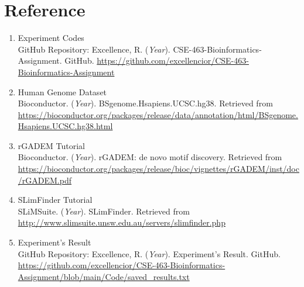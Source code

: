 \section{Reference}
\begin{enumerate}
    \item Experiment Codes \\
    GitHub Repository: Excellence, R. (\textit{Year}). CSE-463-Bioinformatics-Assignment. GitHub. \url{https://github.com/excellencior/CSE-463-Bioinformatics-Assignment}
    
    \item Human Genome Dataset \\
    Bioconductor. (\textit{Year}). BSgenome.Hsapiens.UCSC.hg38. Retrieved from \url{https://bioconductor.org/packages/release/data/annotation/html/BSgenome.Hsapiens.UCSC.hg38.html}
    
    \item rGADEM Tutorial \\
    Bioconductor. (\textit{Year}). rGADEM: de novo motif discovery. Retrieved from \url{https://bioconductor.org/packages/release/bioc/vignettes/rGADEM/inst/doc/rGADEM.pdf}
    
    \item SLimFinder Tutorial \\
    SLiMSuite. (\textit{Year}). SLimFinder. Retrieved from \url{http://www.slimsuite.unsw.edu.au/servers/slimfinder.php}
    
    \item Experiment's Result \\
    GitHub Repository: Excellence, R. (\textit{Year}). Experiment's Result. GitHub. \url{https://github.com/excellencior/CSE-463-Bioinformatics-Assignment/blob/main/Code/saved_results.txt}
\end{enumerate}